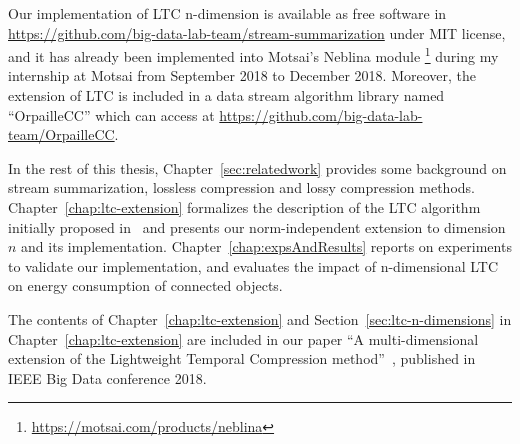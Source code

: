 Our implementation of LTC n-dimension is available as free software in
\url{https://github.com/big-data-lab-team/stream-summarization} under MIT
license, and it has already been implemented into Motsai's Neblina module
\footnote{\url{https://motsai.com/products/neblina}} during my internship at
Motsai from September 2018 to December 2018.  Moreover, the extension of LTC is
included in a data stream algorithm library named ``OrpailleCC'' which can
access at \url{https://github.com/big-data-lab-team/OrpailleCC}.



In the rest of this thesis, Chapter~\ref{sec:relatedwork} provides some
background on stream summarization, lossless compression and lossy compression
methods. Chapter~\ref{chap:ltc-extension} formalizes the description of the LTC
algorithm initially proposed in~\cite{schoellhammer2004lightweight} and presents
our norm-independent extension to dimension $n$ and its implementation.
Chapter~\ref{chap:expsAndResults} reports on experiments to validate our
implementation, and evaluates the impact of n-dimensional LTC on energy
consumption of connected objects.

The contents of Chapter~\ref{chap:ltc-extension} and
Section~\ref{sec:ltc-n-dimensions} in Chapter~\ref{chap:ltc-extension} are
included in our paper ``A multi-dimensional extension of the Lightweight
Temporal Compression method''~\cite{li2018multi}, published in IEEE Big Data
conference 2018.


